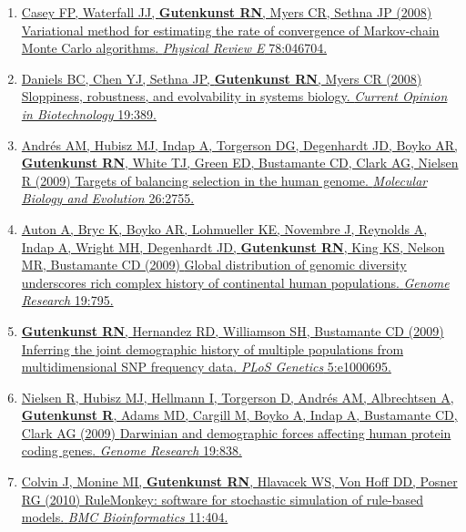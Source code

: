 \documentclass[11pt]{article}
\begin{document}
\begin{enumerate}
\item \href{http://doi.org/10.1103/PhysRevE.78.046704}{\grad Casey FP\corresponding, Waterfall JJ, \textbf{Gutenkunst RN}, Myers CR, Sethna JP (2008) {Variational method for estimating the rate of convergence of Markov-chain Monte Carlo algorithms}.
\newblock \emph{Physical Review E} 78:046704.}


\item \href{http://doi.org/10.1016/j.copbio.2008.06.008}{\grad Daniels BC, Chen YJ, Sethna JP\corresponding, \textbf{Gutenkunst RN}, Myers CR (2008) {Sloppiness,
  robustness, and evolvability in systems biology}.
\newblock \emph{Current Opinion in Biotechnology} 19:389.}


\item \href{http://doi.org/10.1093/molbev/msp190}{Andr\'{e}s AM\corresponding, Hubisz MJ, Indap A, Torgerson DG, Degenhardt JD, Boyko AR,
  \textbf{Gutenkunst RN}, White TJ, Green ED, Bustamante CD, Clark AG, Nielsen R (2009)
  {Targets of balancing selection in the human genome}.
\newblock \emph{Molecular Biology and Evolution} 26:2755.}

\item
\href{http://doi.org/10.1101/gr.088898.108}{Auton A, Bryc K, Boyko AR, Lohmueller KE, Novembre J, Reynolds A, Indap A,
  Wright MH, Degenhardt JD, \textbf{Gutenkunst RN}, King KS, Nelson MR, Bustamante CD\corresponding
  (2009) {Global distribution of genomic diversity underscores rich complex
  history of continental human populations.}
\newblock \emph{Genome Research} 19:795.}

\item
\href{http://doi.org/10.1371/journal.pgen.1000695}{\textbf{Gutenkunst RN}\corresponding, Hernandez RD, Williamson SH, Bustamante CD (2009) {Inferring the
  joint demographic history of multiple populations from multidimensional SNP
  frequency data}.
\newblock \emph{PLoS Genetics} 5:e1000695.}

\item
\href{http://doi.org/10.1101/gr.088336.108}{Nielsen R\corresponding, Hubisz MJ, Hellmann I, Torgerson D, Andr\'{e}s AM, Albrechtsen A,
  \textbf{Gutenkunst R}, Adams MD, Cargill M, Boyko A, Indap A, Bustamante CD, Clark AG
  (2009) {Darwinian and demographic forces affecting human protein coding
  genes}.
\newblock \emph{Genome Research} 19:838.}



\item
\href{http://doi.org/10.1186/1471-2105-11-404}{Colvin J, Monine MI, \textbf{Gutenkunst RN}, Hlavacek WS, {Von Hoff} DD, Posner RG\corresponding
  (2010) {RuleMonkey: software for stochastic simulation of rule-based models.}
\newblock \emph{BMC Bioinformatics} 11:404.}


\end{enumerate}
\end{document}
